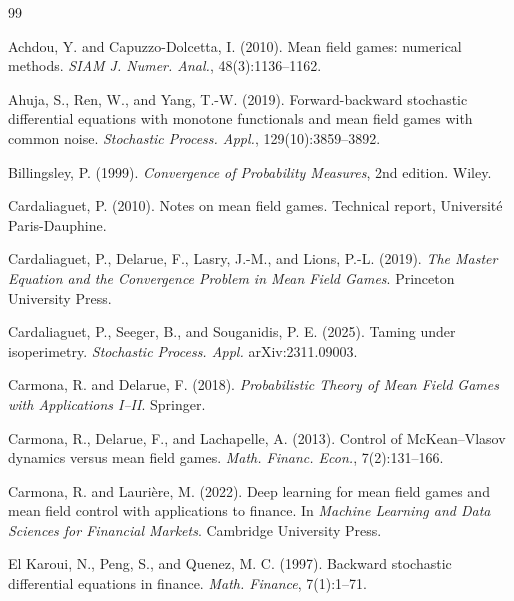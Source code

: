 \documentclass[11pt]{article}
\theoremstyle{remark}
\begin{document}

\begin{thebibliography}{99}

Achdou, Y. and Capuzzo-Dolcetta, I. (2010).
\newblock Mean field games: numerical methods.
\newblock \emph{SIAM J. Numer. Anal.}, 48(3):1136--1162.

Ahuja, S., Ren, W., and Yang, T.-W. (2019).
\newblock Forward-backward stochastic differential equations with monotone
functionals and mean field games with common noise.
\newblock \emph{Stochastic Process. Appl.}, 129(10):3859--3892.

Billingsley, P. (1999).
\newblock \emph{Convergence of Probability Measures}, 2nd edition.
\newblock Wiley.

Cardaliaguet, P. (2010).
\newblock Notes on mean field games.
\newblock Technical report, Universit\'e Paris-Dauphine.

Cardaliaguet, P., Delarue, F., Lasry, J.-M., and Lions, P.-L. (2019).
\newblock \emph{The Master Equation and the Convergence Problem in Mean Field
Games}.
\newblock Princeton University Press.

Cardaliaguet, P., Seeger, B., and Souganidis, P. E. (2025).
\newblock Taming under isoperimetry.
\newblock \emph{Stochastic Process. Appl.} arXiv:2311.09003.

Carmona, R. and Delarue, F. (2018).
\newblock \emph{Probabilistic Theory of Mean Field Games with Applications I--II}.
\newblock Springer.

Carmona, R., Delarue, F., and Lachapelle, A. (2013).
\newblock Control of McKean--Vlasov dynamics versus mean field games.
\newblock \emph{Math. Financ. Econ.}, 7(2):131--166.

Carmona, R. and Lauri\`ere, M. (2022).
\newblock Deep learning for mean field games and mean field control with
applications to finance.
\newblock In \emph{Machine Learning and Data Sciences for Financial Markets}.
Cambridge University Press.

El Karoui, N., Peng, S., and Quenez, M. C. (1997).
\newblock Backward stochastic differential equations in finance.
\newblock \emph{Math. Finance}, 7(1):1--71.


\end{thebibliography}
\end{document}
